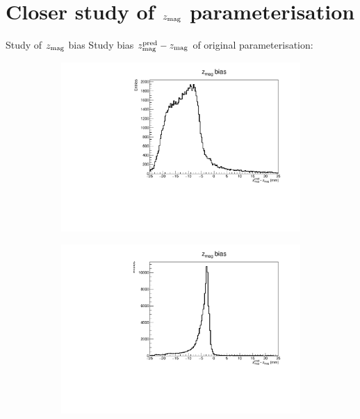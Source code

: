 \documentclass[xcolor={dvipsnames}]{beamer}
\begin{document}
\section{Closer study of \texorpdfstring{$z_{\rm mag}$}{zMag} parameterisation}

\begin{frame}{Study of $z_{\rm mag}$ bias}
  \vspace{0.0cm}
  {\Large Study bias $z_{\rm mag}^{\rm pred} - z_{\rm mag}$ of original parameterisation:}
  \begin{figure}[htb]
    \centering
    \begin{subfigure}{0.50\textwidth}
      \includegraphics[width=1\textwidth]{Plots/z_mag_position_bias_old_parameterisation_low_p.pdf}
    \end{subfigure}%
    \begin{subfigure}{0.50\textwidth}
      \includegraphics[width=1\textwidth]{Plots/z_mag_position_bias_old_parameterisation_high_p.pdf}

\end{subfigure}
\end{figure}
\end{frame}
\end{document}
